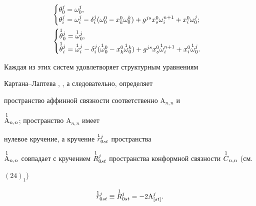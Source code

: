 \begin{align} 


& 


\begin{cases} 


\theta^j_0=\omega^j_0, \\ 


\theta^j_i=\omega^j_i-\delta^j_i(\omega^0_0-x^0_k\omega^k_0) 


+g^{j s}x^0_s \omega^{n+1}_i+x^0_i\omega^j_0; 


\end{cases} 


\\ 


& 


\begin{cases} 


\up{1}{\theta}{}^j_0=\up{1}{\omega}{}^j_0, \\


\up{1}{\theta}{}^j_i=\up{1}{\omega}{}^j_i-\delta^j_i 


(\up{1}{\omega}{}^0_0-x^0_k\up{1}{\omega}{}^k_0)+g^{j s}x^0_s 


\up{1}{\omega}{}^{n+1}_i+x^0_i\up{1}{\omega}{}^j_0. 


\end{cases} 


\end{align} 


Каждая из этих систем удовлетворяет структурным уравнениям 


Картана--Лаптева \cite{6}, \cite{8}, а следовательно, определяет 


пространство аффинной связности соответственно $\mathrm A_{n,n}$ и 


$\overset{1}{\mathrm A}{}{}_{n,n}$; пространство $\mathrm A_{n,n}$ имеет 


нулевое кручение, а кручение $\overset{1}{r}{}{}^j_{0s t}$ пространства 


$\up{1}{\mathrm A}{}_{n,n}$ совпадает с кручением $\up{1}{R}{}^j_{0s 


t}$ пространства конформной связности $\up{1}{C}{}_{n,n}$ (см. 


$(24)_1$)


$$ 


\up{1}{r}{}^j_{0s t}\equiv \up{1}{R}{}^j_{0s t}= 


-2\mathrm A{}^j_{[s t]}. 


$$ 


 


